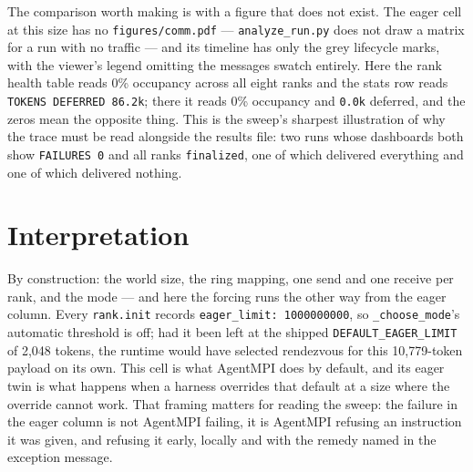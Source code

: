 \documentclass[11pt]{article}
\begin{document}
The comparison worth making is with a figure that does not exist. The eager cell at
this size has no \texttt{figures/comm.pdf} --- \texttt{analyze\_run.py} does not draw
a matrix for a run with no traffic --- and its timeline has only the grey lifecycle
marks, with the viewer's legend omitting the messages swatch entirely. Here the rank
health table reads 0\% occupancy across all eight ranks and the stats row reads
\texttt{TOKENS DEFERRED 86.2k}; there it reads 0\% occupancy and \texttt{0.0k}
deferred, and the zeros mean the opposite thing. This is the sweep's sharpest
illustration of why the trace must be read alongside the results file: two runs whose
dashboards both show \texttt{FAILURES 0} and all ranks \texttt{finalized}, one of
which delivered everything and one of which delivered nothing.

\section{Interpretation}

By construction: the world size, the ring mapping, one send and one receive per rank,
and the mode --- and here the forcing runs the other way from the eager column. Every
\texttt{rank.init} records \texttt{eager\_limit: 1000000000}, so
\texttt{\_choose\_mode}'s automatic threshold is off; had it been left at the shipped
\texttt{DEFAULT\_EAGER\_LIMIT} of 2{,}048 tokens, the runtime would have selected
rendezvous for this 10{,}779-token payload on its own. This cell is what AgentMPI
does by default, and its eager twin is what happens when a harness overrides that
default at a size where the override cannot work. That framing matters for reading
the sweep: the failure in the eager column is not AgentMPI failing, it is AgentMPI
refusing an instruction it was given, and refusing it early, locally and with the
remedy named in the exception message.
\end{document}
